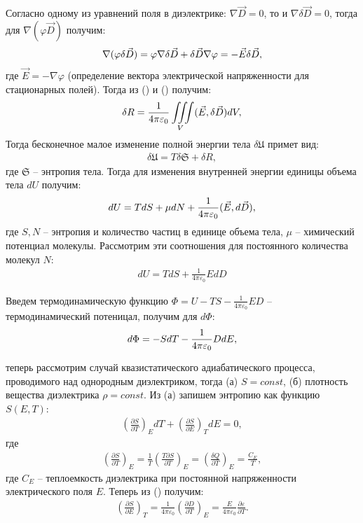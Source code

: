 \documentclass[__main__.tex]{subfiles}
\begin{document}
Согласно одному из уравнений поля в диэлектрике: $\nabla{\vec{D}}=0$, то и $\nabla{\delta\vec{D}}=0$, тогда для $\nabla(\varphi\vec{D})$ получим:
\begin{gather}
	\nabla(\varphi\delta\vec{D}) =
	\varphi\nabla\delta\vec{D} + \delta\vec{D}\nabla\varphi = -\vec{E}\delta\vec{D},\llabel{eq:mansy}
\end{gather}
где $\vec{E}=-\nabla\varphi$ (определение вектора электрической напряженности для стационарных полей). Тогда из () и () получим:
\begin{gather}
	\delta R = \frac{1}{4\pi\varepsilon_0}\iiint\limits_{V}(\vec{E},\delta\vec{D})dV,
	\llabel{eq:final-work}
\end{gather}
Тогда бесконечное малое изменение полной энергии тела $\delta\mathfrak{U}$ примет вид:
\begin{gather}
	\delta\mathfrak{U} = T\delta\mathfrak{S} + \delta R,
\end{gather}
где $\mathfrak{S}$ -- энтропия тела. Тогда для изменения внутренней энергии единицы объема тела $dU$ получим:
\begin{gather}
	dU = TdS + \mu dN + \frac{1}{4\pi\varepsilon_0}(\vec{E},d\vec{D}),
	\llabel{eq:du-final}
\end{gather}
где $S, N$ -- энтропия и количество частиц в единице объема тела, $\mu$ -- химический потенциал молекулы. Рассмотрим эти соотношения для постоянного количества молекул $N$:
\begin{gather}
	dU = TdS + \frac{1}{4\pi\varepsilon_0}EdD
\end{gather}

Введем термодинамическую функцию $\Phi = U - TS - \frac{1}{4\pi\varepsilon_0}ED$ -- термодинамический потеницал, получим для $d\Phi$:
\begin{gather}
	d\Phi = -SdT - \frac{1}{4\pi\varepsilon_0}DdE,
	\llabel{eq:memes}
\end{gather}

теперь рассмотрим случай квазистатического адиабатического процесса, проводимого над однородным диэлектриком, тогда (а) $S=const$, (б) плотность вещества диэлектрика $\rho=const$. Из (а) запишем энтропию как функцию $S(E,T)$:
\begin{gather}
	\left(\frac{\partial S}{\partial T}\right)_E dT + \left(\frac{\partial S}{\partial E}\right)_T dE = 0,
\end{gather}
где
\begin{gather}
	\left(\frac{\partial S}{\partial T}\right)_E =
	\frac{1}{T}\left(\frac{T\partial S}{\partial T}\right)_E =
	\left(\frac{\delta Q}{\partial T}\right)_E =
	\frac{C_E}{T},
\end{gather}
где $C_E$ -- теплоемкость диэлектрика при постоянной напряженности электрического поля $E$. Теперь из () получим:
\begin{gather}
	\left(\frac{\partial S}{\partial E}\right)_T =
	\frac{1}{4\pi\varepsilon_0}\left(\frac{\partial D}{\partial T}\right)_E =
	\frac{E}{4\pi\varepsilon_0}\frac{\partial \varepsilon}{\partial T}.
\end{gather}
\end{document}
